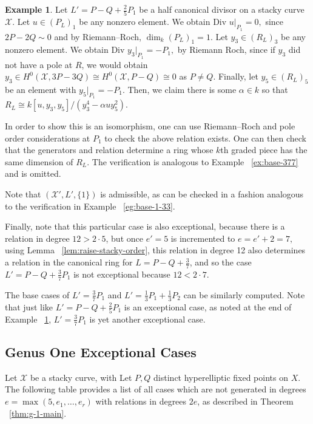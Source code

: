 \documentclass{amsart}
\theoremstyle{plain}
\theoremstyle{definition}
\newtheorem{example}[thm]{Example}
\theoremstyle{remark}
\numberwithin{equation}{section}
\newcommand\ssec{\subsection}
\newcommand \sx{\mathscr X}
\newcommand \di{\text{Div }}
\newcommand \halfcan{L}
\begin{document}
\begin{example}
\label{eg:exception-1-5}
Let $L' = P - Q + \frac{2}{5}P_1$ be a half canonical divisor on a stacky curve $\sx$. Let $u \in (P_L)_1$ be any nonzero element. We obtain $\di u|_{P_1} = 0,$ since $2P -2Q \sim 0$ and by Riemann--Roch, $\dim_k (P_L)_1 = 1.$ Let $y_3 \in (R_L)_3$ be any nonzero element. We obtain $\di y_3|_{P_1} = - P_1,$ by Riemann Roch, since if $y_3$ did not have a pole at $R$, we would obtain $y_3 \in H^0(\sx,3P-3Q) \cong H^0(\sx, P - Q) \cong 0$ as $P \neq Q$. Finally, let $y_5 \in (R_L)_5$ be an element with $y_5|_{P_1} = -P_1$. Then, we claim there is some $\alpha \in k$ so that
$R_L \cong k[u, y_3, y_5]/(y_3^4 - \alpha uy_5^2).$

In order to show this is an isomorphism, one can use Riemann--Roch and pole order considerations at $P_1$ to check the above relation exists. One can then check that the generators and relation determine a ring whose $k$th graded piece has the same dimension of $R_L$. The verification is analogous to Example ~\ref{ex:base-377} and is omitted.

Note that $(\sx', \halfcan', \{1\})$ is admissible, as can be checked in a fashion analogous to the verification in Example ~\ref{eg:base-1-33}.

Finally, note that this particular case is also exceptional, because there is a relation in degree $12 > 2 \cdot 5$, but once $e' = 5$ is incremented to $e = e'+2 = 7,$ using Lemma ~\ref{lem:raise-stacky-order}, this relation in degree 12 also determines a relation in the canonical ring for $L = P - Q + \frac{3}{7}$, and so the case $L' = P - Q + \frac{3}{7}P_1$ is not exceptional because $12 < 2 \cdot 7$.
\end{example}




The base cases of $L' = \frac{3}{7}P_1$ and $L' = \frac{1}{3}P_1 +\frac{1}{3}P_2$ can be similarly computed. Note that just like $L' = P - Q + \frac{2}{5}P_1$ is an exceptional case, as noted at the end of Example ~\ref{eg:exception-1-5}, $L' = \frac{3}{7}P_1$ is yet another exceptional case.


\ssec{Genus One Exceptional Cases}
\label{ssec:g-1-exceptional}
Let $\sx$ be a stacky curve, with Let $P,Q$ distinct hyperelliptic fixed points on $X$. The following table provides a list of all cases which are not generated in degrees $e=\max(5,e_1,\ldots, e_r)$ with relations in degrees $2e$, as described in Theorem ~\ref{thm:g-1-main}.
\end{document}
